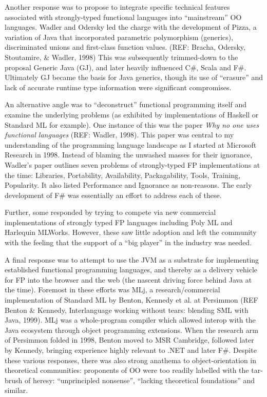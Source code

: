 \documentclass[acmsmall]{acmart}\settopmatter{}
\begin{document}
Another response was to propose to integrate specific technical features associated with strongly-typed functional languages into “mainstream” OO
languages.  Wadler and Odersky led the charge with the development of Pizza, a variation of Java that incorporated parametric polymorphism (generics), discriminated
unions and first-class function values. (REF: Bracha, Odersky, Stoutamire, \& Wadler, 1998)  This was subsequently trimmed-down to the proposal Generic
Java (GJ), and later heavily influenced C\#, Scala and F\#. Ultimately GJ became the basis for Java generics, though its use of “erasure” and lack of accurate
runtime type information were significant compromises. 

An alternative angle was to “deconstruct” functional programming itself and examine the underlying problems (as exhibited by implementations of Haskell
or Standard ML for example). One instance of this was the paper \textit{Why no one uses functional languages} (REF: Wadler, 1998). This paper was central to
my understanding of the programming language landscape as I started at Microsoft Research in 1998.  Instead of blaming the unwashed masses for their
ignorance, Wadler’s paper outlines seven problems of strongly-typed FP implementations at the time: Libraries, Portability, Availability, Packagability, Tools,
Training, Popularity.  It also listed Performance and Ignorance as non-reasons. The early development of F\# was essentially an effort to address each of these.

Further, some responded by trying to compete via new commercial implementations of strongly typed FP languages including Poly ML and Harlequin MLWorks. However,
these saw little adoption and left the community with the feeling that the support of a “big player” in the industry was needed. 

A final response was to attempt to use the JVM as a substrate for implementing established functional programming languages, and thereby as a delivery
vehicle for FP into the browser and the web (the nascent driving force behind Java at the time).  Foremost in these efforts was MLj, a research/commercial
implementation of Standard ML by Benton, Kennedy et al. at Persimmon (REF Benton \& Kennedy, Interlanguage working without tears: blending SML with
Java, 1999).  MLj was a whole-program compiler which allowed interop with the Java ecosystem through object programming extensions. When the research
arm of Persimmon folded in 1998, Benton moved to MSR Cambridge, followed later by Kennedy, bringing experience highly relevant to .NET and later F\#. Despite
these various responses, there was also strong anathema to object-orientation in theoretical communities: proponents of OO were too readily labelled with the
tar-brush of heresy: “unprincipled nonsense”, “lacking theoretical foundations” and similar.  
\end{document}
